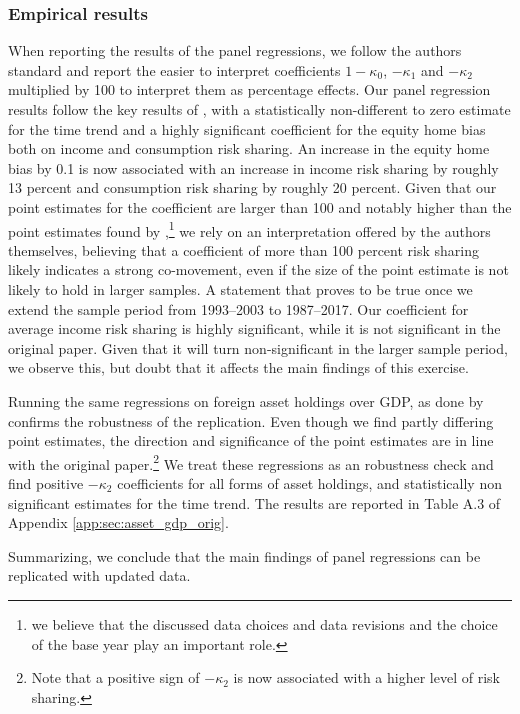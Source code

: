 \documentclass[11pt,a4paper]{article}
\begin{document}
\subsubsection{Empirical results}
When reporting the results of the panel regressions, we follow
the authors standard and report the easier to interpret 
coefficients \(1-\kappa_0\), \(-\kappa_1\) and \(-\kappa_2\) multiplied
by 100 to interpret them as percentage effects. Our panel regression results follow the key results of 
\textcite{main}, with a statistically 
non-different to zero estimate for the time trend and a highly significant coefficient
for the equity home bias both on income and consumption risk sharing. An increase in the equity home bias by 0.1 
is now associated with an increase in income risk sharing by roughly 13 percent and consumption risk sharing by 
roughly 20 percent. Given that our point estimates for the coefficient are larger than 100 and 
notably higher than the point estimates found by \textcite{main},\footnote{we believe that the discussed data choices and data revisions and the choice of the 
base year play an important role.} we rely on an interpretation
offered by the authors themselves, believing that a coefficient of more than 100 percent risk sharing likely indicates a strong co-movement, even if the size of the point estimate is not likely to 
hold in larger samples. A statement that proves to be true once we extend the sample period from 1993--2003 to 1987--2017. Our coefficient for average income risk sharing
is highly significant, while it is not significant in the original paper. Given that it will turn non-significant in the larger sample period, we observe this, but doubt that it affects the main findings of this exercise. 



Running the same regressions on foreign asset holdings over GDP, as done by \textcite{main} confirms the robustness of the replication. Even 
though we find partly differing point estimates, the direction and significance of the point estimates are in line with the original paper.\footnote{Note that a positive 
sign of \(-\kappa_2\) is now associated with a higher level of risk sharing.}  We treat these regressions as an robustness check and find positive \(-\kappa_2\) coefficients 
for all forms of asset holdings, and statistically non significant estimates for the time trend. The results are reported in Table A.3 of Appendix \ref{app:sec:asset_gdp_orig}.

Summarizing, we conclude that the main findings of \textcite{main} panel regressions can be replicated with updated data.
\end{document}
